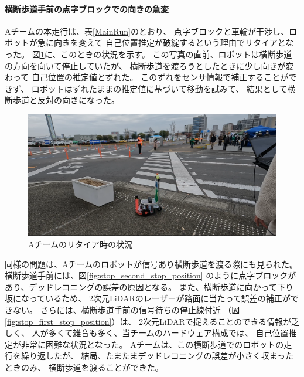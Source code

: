 \documentclass[twocolumn,9pt]{jsproceedings}
\begin{document}
\paragraph{横断歩道手前の点字ブロックでの向きの急変}


Aチームの本走行は、表\ref{MainRun}のとおり、
点字ブロックと車輪が干渉し、ロボットが急に向きを変えて
自己位置推定が破綻するという理由でリタイアとなった。
図\ref{fig:crosswalk_city_hall}に、このときの状況を示す。
この写真の直前、ロボットは横断歩道の方向を向いて停止していたが、
横断歩道を渡ろうとしたときに少し向きが変わって
自己位置の推定値とずれた。
このずれをセンサ情報で補正することができず、
ロボットはずれたままの推定値に基づいて移動を試みて、
結果として横断歩道と反対の向きになった。

\begin{figure}[h]
  \begin{center}
    \includegraphics[width=1.0\linewidth]{figs/crosswalk_city_hall.pdf}
	  \caption{Aチームのリタイア時の状況}
    \label{fig:crosswalk_city_hall}
  \end{center}
\end{figure}

同様の問題は、Aチームのロボットが信号あり横断歩道を渡る際にも見られた。
横断歩道手前には、図\ref{fig:stop_second_stop_position}
のように点字ブロックがあり、デッドレコニングの誤差の原因となる。
また、横断歩道に向かって下り坂になっているため、
2次元LiDARのレーザーが路面に当たって誤差の補正ができない。
さらには、横断歩道手前の信号待ちの停止線付近
（図\ref{fig:stop_first_stop_position}）は、
2次元LiDARで捉えることのできる情報が乏しく、
人が多くて雑音も多く、当チームのハードウェア構成では、
自己位置推定が非常に困難な状況となった。
Aチームは、この横断歩道でのロボットの走行を繰り返したが、
結局、たまたまデッドレコニングの誤差が小さく収まったときのみ、
横断歩道を渡ることができた。
\end{document}
